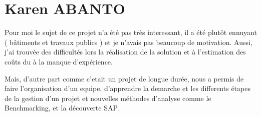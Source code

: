 \section{Karen ABANTO }

Pour moi le sujet de ce projet n'a été pas très interessant, il a été plutôt
 ennuyant ( bâtiments et travaux publics )
et je n'avais pas beaucoup de motivation. Aussi, j'ai trouvée des 
difficultés lors la réalisation de la solution 
et à l'estimation des coûts du à la manque d'expérience. 

Mais, d'autre part comme c'etait un projet de longue durée, nous a permis de 
faire l'organisation d'un equipe, 
d'apprendre la demarche et les differents étapes de la gestion d'un projet 
et nouvelles méthodes d'analyse
comme le Benchmarking, et la découverte SAP.






